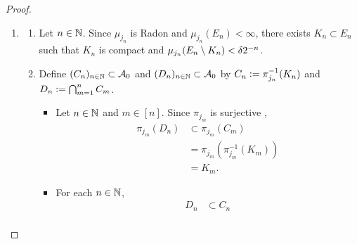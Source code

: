 \documentclass{book}
\begin{document}
\begin{proof}
\begin{enumerate}
			Since $J$ is directed, for each $n \in \N$, there exists $j_n \in J$ such that $j^1_n, j^2_n \leq j_n$. The axiom of countable choice implies that there exists $(j_n)_{n \in \N} \subset J$ such that for each $n \in \N$, $j^1_n, j^2_n \leq j_n$. For each $n \in \N$, define $E_n \defeq \pi_{j^2_n, j_n}^{-1}(E^2_n)$. 
			\begin{itemize}
				\item Then for each $n \in \N$, 
				\begin{align*}
					B_n
					& = \pi_{j^2_n}^{-1}(E^2_n) \\
					& = (\pi_{j^2_n, j_n} \circ \pi_{j_n}){-1}(E^2_n) \\
					& = \pi_{j_n}^{-1}(\pi_{j^2_n, j_n}^{-1}(E^2_n)) \\
					& = \pi_{j_n}^{-1}(E_n).
				\end{align*}
				\item Let $j \in J$. Then there exists $n \in \N$ such that $j = j^1_n$. By construction, 
				\begin{align*}
					j
					& = j^1_n \\
					& \leq j_n.
				\end{align*}
				Since $j \in J$ is arbitrary, we have that for each $j \in J$, there exists $n \in \N$ such that $j \leq j_n$. 
			\end{itemize}
			\item
			\begin{enumerate}
				\item Let $n \in \N$. Since $\mu_{j_n}$ is Radon and $\mu_{j_n}(E_n) < \infty$, there exists $K_n \subset E_n$ such that $K_n$ is compact and $\mu_{j_n}(E_n \setminus K_n) < \delta2^{-n}$.
				\item Define $(C_n)_{n \in \mathbb{N}} \subset \mathcal{A}_0$ and $(D_n)_{n \in \mathbb{N}} \subset \mathcal{A}_0$ by $C_n \vcentcolon= \pi_{j_n}^{-1}(K_n)$ and $D_n \vcentcolon= \bigcap_{m=1}^n C_m$. 
				\begin{itemize}
					\item Let $n \in \N$ and $m \in [n]$. Since $\pi_{j_m}$ is surjective , 
					\begin{align*}
						\pi_{j_m}(D_n)
						& \subset \pi_{j_m}(C_m) \\
						& = \pi_{j_m}(\pi_{j_m}^{-1}(K_m)) \\
						& = K_m. 
					\end{align*}
					\item For each $n \in \N$, 
					\begin{align*}
						D_n 
						& \subset C_n \\

\end{align*}
\end{itemize}
\end{enumerate}
\end{enumerate}
\end{proof}
\end{document}
